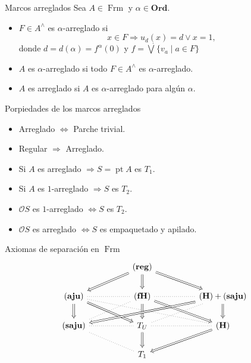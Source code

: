 \documentclass[compress,12pt]{beamer}
\DeclareMathOperator{\pt}{pt}
\DeclareMathOperator{\Frm}{Frm}
\begin{document}
\begin{frame}{Marcos arreglados}
Sea $A\in \Frm$ y $\alpha\in \mathbf{Ord}$. 
    \begin{itemize}
        \item $F\in A^\wedge$ es $\alpha$-arreglado si 
    \[
    x\in F\Rightarrow u_d(x)=d\vee x=1,
    \]
    donde $d=d(\alpha)=f^\alpha(0)$ y $f=\dot{\bigvee}\{v_a\mid a\in F\}$
    \item $A$ es $\alpha$-arreglado si todo $F\in A^\wedge$ es $\alpha$-arreglado.
    \item $A$ es arreglado si $A$ es $\alpha$-arreglado para algún $\alpha$.
    \end{itemize}
\end{frame}

\begin{frame}{Porpiedades de los marcos arreglados}
\begin{itemize}
	\item Arreglado $\Leftrightarrow$ Parche trivial.
	\item Regular $\Rightarrow$ Arreglado.
	\item Si $A$ es arreglado $\Rightarrow S=\pt A$ es $T_1$.
	\item Si $A$ es $1$-arreglado $\Rightarrow S$ es $T_2$.
	\item $\mathcal{O}S$ es $1$-arreglado $\Leftrightarrow S$ es $T_2$.
	\item $\mathcal{O}S$ es arreglado $\Leftrightarrow S$ es empaquetado y apilado.  
\end{itemize}
\end{frame}

\begin{frame}{Axiomas de separación en $\Frm$}
    \[\begin{tikzcd}
	&& {\mathbf{(reg)}} \\
	{\mathbf{(aju)}} && {\mathbf{(fH)}} && {\mathbf{(H)}+\mathbf{(saju)}} \\
	{\mathbf{(saju)}} && {T_U} && {\mathbf{(H)}} \\
	&& {T_1}
	\arrow[Rightarrow, from=1-3, to=2-1]
	\arrow[Rightarrow, from=1-3, to=2-3]
	\arrow[Rightarrow, from=1-3, to=2-5]
	\arrow[dotted, no head, from=2-1, to=2-3]
	\arrow[Rightarrow, from=2-1, to=3-1]
	\arrow[Rightarrow, from=2-1, to=3-3]
	\arrow[dotted, no head, from=2-1, to=3-5]
	\arrow[dotted, no head, from=2-3, to=2-5]
	\arrow[dotted, no head, from=2-3, to=3-1]
	\arrow[Rightarrow, from=2-3, to=3-3]
	\arrow[Rightarrow, from=2-3, to=3-5]
	\arrow[Rightarrow, from=2-5, to=3-1]
	\arrow[dotted, no head, from=2-5, to=3-3]
	\arrow[Rightarrow, from=2-5, to=3-5]
	\arrow[dotted, no head, from=3-1, to=3-3]
	\arrow[dotted, no head, from=3-1, to=4-3]
	\arrow[dotted, no head, from=3-3, to=3-5]
	\arrow[Rightarrow, from=3-3, to=4-3]
	\arrow[Rightarrow, from=3-5, to=4-3]
\end{tikzcd}\]
\end{frame}
\end{document}

